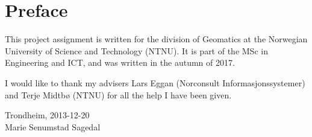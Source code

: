 \section*{Preface}


This project assignment is written for the division of Geomatics at the Norwegian University of Science and Technology (NTNU). It is part of the MSc in Engineering and ICT, and was written in the autumn of 2017. 

I would like to thank my advisers Lars Eggan (Norconsult Informasjonssystemer) and Terje Midtbø (NTNU) for all the help I have been given.
\newline
\newline

\begin{center}
Trondheim, 2013-12-20\\[1pc]
Marie Senumstad Sagedal\\[1pc]
\end{center}